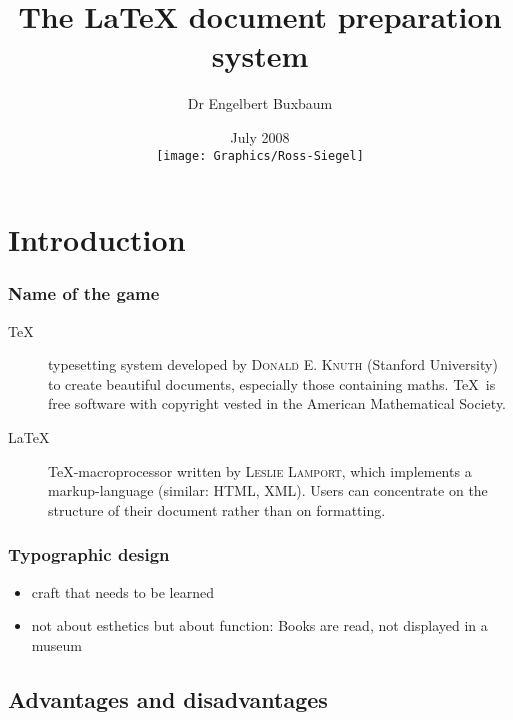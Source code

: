 \documentclass[presentation,hideothersubsections,final,10pt,american]{beamer}
\title{The \alert{\LaTeX} document preparation system}
\institute{Department of Biochemistry, RUSM}
\author{Dr Engelbert Buxbaum}
\date{July 2008\\ \vspace{5mm}
    \texttt{[image: Graphics/Ross-Siegel]}}
\begin{document}
  {%
    \insertframenumber
  }

\frame{\titlepage}

\section{Introduction}

\begin{frame}
  \frametitle{Name of the game}
  \begin{description}
    \item[\TeX]{typesetting system developed by
        \textsc{Donald E. Knuth} (Stanford University) to
        create beautiful documents, especially those
        containing maths. \TeX\ is free software with
        copyright vested in the American Mathematical
        Society.}
    \item[\LaTeX]{\TeX -macroprocessor written by \textsc{Leslie
        Lamport}, which implements a markup-language (similar: HTML, XML). Users can
        concentrate on the structure of their document rather than on
        formatting.}
  \end{description}
\end{frame}

\begin{frame}
  \frametitle{Typographic design}
  \begin{itemize}
    \item{craft that needs to be learned}
    \item{not about esthetics but about function: Books are
        read, not displayed in a museum}
  \end{itemize}
\end{frame}

\subsection{Advantages and disadvantages}
\end{document}
